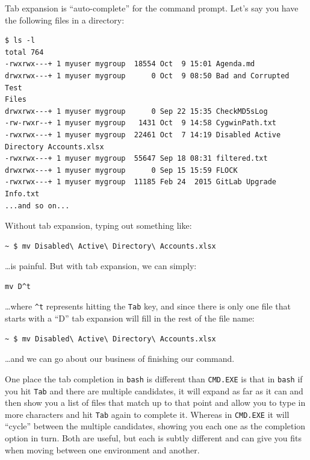 \documentclass[10pt,]{book}
\numberwithin{figure}{chapter}
\begin{document}
Tab expansion is ``auto-complete'' for the command prompt. Let's say you
have the following files in a directory:

\begin{verbatim}
$ ls -l
total 764
-rwxrwx---+ 1 myuser mygroup  18554 Oct  9 15:01 Agenda.md
drwxrwx---+ 1 myuser mygroup      0 Oct  9 08:50 Bad and Corrupted Test
Files
drwxrwx---+ 1 myuser mygroup      0 Sep 22 15:35 CheckMD5sLog
-rw-rwxr--+ 1 myuser mygroup   1431 Oct  9 14:58 CygwinPath.txt
-rwxrwx---+ 1 myuser mygroup  22461 Oct  7 14:19 Disabled Active Directory Accounts.xlsx
-rwxrwx---+ 1 myuser mygroup  55647 Sep 18 08:31 filtered.txt
drwxrwx---+ 1 myuser mygroup      0 Sep 15 15:59 FLOCK
-rwxrwx---+ 1 myuser mygroup  11185 Feb 24  2015 GitLab Upgrade Info.txt
...and so on...
\end{verbatim}

Without tab expansion, typing out something like:

\begin{verbatim}
~ $ mv Disabled\ Active\ Directory\ Accounts.xlsx
\end{verbatim}

\ldots{}is painful. But with tab expansion, we can simply:

\begin{verbatim}
mv D^t
\end{verbatim}

\ldots{}where \texttt{\^{}t} represents hitting the \texttt{Tab} key,
and since there is only one file that starts with a ``D'' tab expansion
will fill in the rest of the file name:

\begin{verbatim}
~ $ mv Disabled\ Active\ Directory\ Accounts.xlsx
\end{verbatim}

\ldots{}and we can go about our business of finishing our command.

One place the tab completion in \texttt{bash} is different than
\texttt{CMD.EXE} is that in \texttt{bash} if you hit \texttt{Tab} and
there are multiple candidates, it will expand as far as it can and then
show you a list of files that match up to that point and allow you to
type in more characters and hit \texttt{Tab} again to complete it.
Whereas in \texttt{CMD.EXE} it will ``cycle'' between the multiple
candidates, showing you each one as the completion option in turn. Both
are useful, but each is subtly different and can give you fits when
moving between one environment and another.
\end{document}
